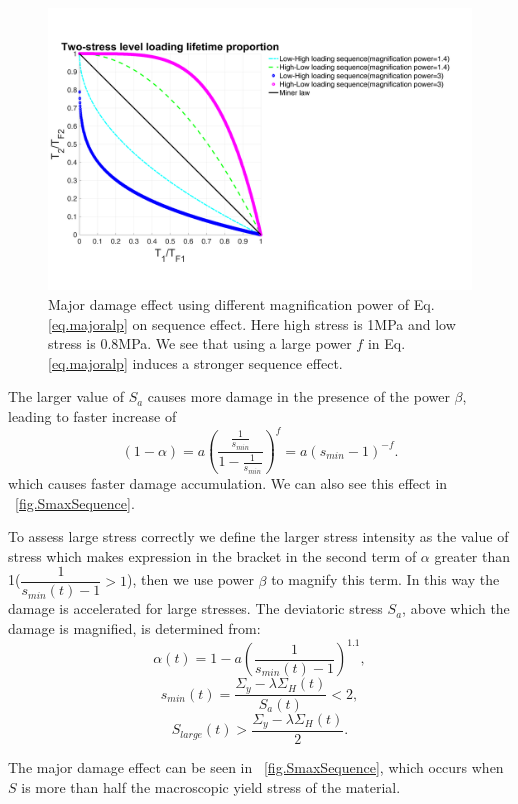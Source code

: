 \documentclass[3p,times,procedia,number]{elsarticle}
\newcommand{\figref}[1]{\figurename~\ref{#1}}
\begin{document}
\begin{figure}[!h]
	\centering
	\includegraphics[width=\textwidth]{figures//sequence_ours.png} 
	\caption{Major damage effect using different magnification power of Eq.\eqref{eq.majoralp} on sequence effect. Here high stress is 1MPa and low stress is 0.8MPa. We see that using a large power $f$ in Eq.\eqref{eq.majoralp} induces a stronger sequence effect.}
	\label{fig.sequenceours}
\end{figure}

The larger value of $S_{a}$ causes more damage in the presence of the power $\beta$, leading to faster increase of 
$$(1-\alpha)=a\left(  \dfrac{\frac{1}{s_{min}}}{1-\frac{1}{s_{min}}} \right) ^{f}=a(s_{min}-1)^{-f}.$$ 
which causes faster damage accumulation. We can also see this effect in \figref{fig.SmaxSequence}. 

To assess large stress correctly we define the larger stress intensity as the value of stress which makes expression in the bracket in the second term of $\alpha$ greater than 1($ \dfrac{1}{ s_{min}(t)-1 }>1$), then we use power $\beta$ to magnify this term. In this way the damage is accelerated for large stresses. The deviatoric stress $S_{a}$, above which the damage is magnified,  is determined from: 
$$\alpha(t)=1-a\left( \dfrac{1}{ s_{min}(t)-1 } \right)^{1.1},$$
$$s_{min}(t)=\dfrac{\Sigma_y-\lambda \Sigma_H(t)}{S_{a}(t)}<2,$$
$$S_{large}(t)>\dfrac{\Sigma_y-\lambda \Sigma_H(t)}{2}.$$ 

The major damage effect can be seen in \figref{fig.SmaxSequence}, which occurs when $S$ is more than half the macroscopic yield stress of the material.
\end{document}
